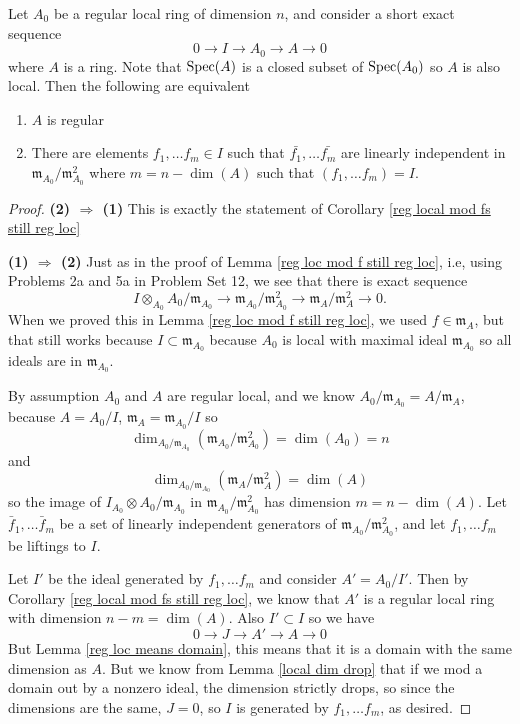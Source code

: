\begin{theorem} Let $A_0$ be a regular local ring of dimension $n$, and consider a short exact sequence
\[0 \to I \to A_0 \to A \to 0\]
where $A$ is a ring. Note that $\operatorname{Spec}(A)$ is a closed subset of $\operatorname{Spec}(A_0)$ so $A$ is also local. Then the following are equivalent
\begin{enumerate}
\item $A$ is regular
\item There are elements $f_1, \ldots f_m \in I$ such that $\bar{f_1}, \ldots \bar{f_m}$ are linearly independent in $\mathfrak{m}_{A_0}/\mathfrak{m}_{A_0}^2$ where $m=n-\dim(A)$ such that $(f_1, \ldots f_m)=I$.
\end{enumerate}
\label{reg loc main thm}
\end{theorem}
\begin{proof} \textbf{(2) $\Rightarrow$ (1)} This is exactly the statement of Corollary \ref{reg local mod fs still reg loc}

\noindent \textbf{(1) $\Rightarrow$ (2)} Just as in the proof of Lemma \ref{reg loc mod f still reg loc}, i.e, using Problems 2a and 5a in Problem Set 12, we see that there is exact sequence
\[I \otimes_{A_0} A_0/\mathfrak{m}_{A_0} \to \mathfrak{m}_{A_0}/\mathfrak{m}_{A_0}^2 \to \mathfrak{m}_{A}/\mathfrak{m}_{A}^2  \to 0.\]
When we proved this in Lemma \ref{reg loc mod f still reg loc}, we used $f \in \mathfrak{m}_A$, but that still works because $I \subset \mathfrak{m}_{A_0}$ because $A_0$ is local with maximal ideal $\mathfrak{m}_{A_0}$ so all ideals are in $\mathfrak{m}_{A_0}$.

By assumption $A_0$ and $A$ are regular local, and we know $A_0/\mathfrak{m}_{A_0}=A/\mathfrak{m}_A$, because $A=A_0/I$, $\mathfrak{m}_A=\mathfrak{m}_{A_0}/I$ so
\[\dim_{A_0/\mathfrak{m}_{A_0}}(\mathfrak{m}_{A_0}/\mathfrak{m}_{A_0}^2)=\dim(A_0)=n\]
and
\[\dim_{A_0/\mathfrak{m}_{A_0}}(\mathfrak{m}_{A}/\mathfrak{m}_{A}^2)=\dim(A)\]
so the image of $I_{A_0}\otimes A_0/\mathfrak{m}_{A_0}$ in $\mathfrak{m}_{A_0}/\mathfrak{m}_{A_0}^2$ has dimension $m=n-\dim(A)$. Let $\bar{f}_1, \ldots \bar{f}_m$ be a set of linearly independent generators of $\mathfrak{m}_{A_0}/\mathfrak{m}_{A_0}^2$, and let $f_1, \ldots f_m$ be liftings to $I$.

Let $I'$ be the ideal generated by $f_1, \ldots f_m$ and consider $A'=A_0/I'$. Then by Corollary \ref{reg local mod fs still reg loc}, we know that $A'$ is a regular local ring with dimension $n-m=\dim(A)$. Also $I' \subset I$ so we have
\[0 \to J \to A' \to A \to 0\]
But Lemma \ref{reg loc means domain}, this means that it is a domain with the same dimension as $A$. But we know from Lemma \ref{local dim drop} that if we mod a domain out by a nonzero ideal, the dimension strictly drops, so since the dimensions are the same, $J=0$, so $I$ is generated by $f_1, \ldots f_m$, as desired.

\end{proof}

